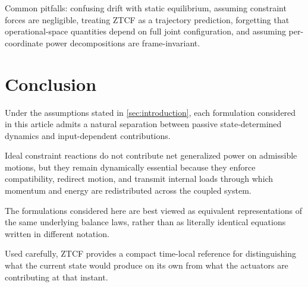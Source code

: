 \documentclass[11pt]{article}
\begin{document}
Common pitfalls: confusing drift with static equilibrium, assuming constraint forces are negligible, treating ZTCF as a trajectory prediction, forgetting that operational-space quantities depend on full joint configuration, and assuming per-coordinate power decompositions are frame-invariant.


\section{Conclusion}\label{sec:conclusion}

Under the assumptions stated in \cref{sec:introduction}, each formulation considered in this article admits a natural separation between passive state-determined dynamics and input-dependent contributions.

Ideal constraint reactions do not contribute net generalized power on admissible motions, but they remain dynamically essential because they enforce compatibility, redirect motion, and transmit internal loads through which momentum and energy are redistributed across the coupled system.

The formulations considered here are best viewed as equivalent representations of the same underlying balance laws, rather than as literally identical equations written in different notation.

Used carefully, ZTCF provides a compact time-local reference for distinguishing what the current state would produce on its own from what the actuators are contributing at that instant.
\end{document}
